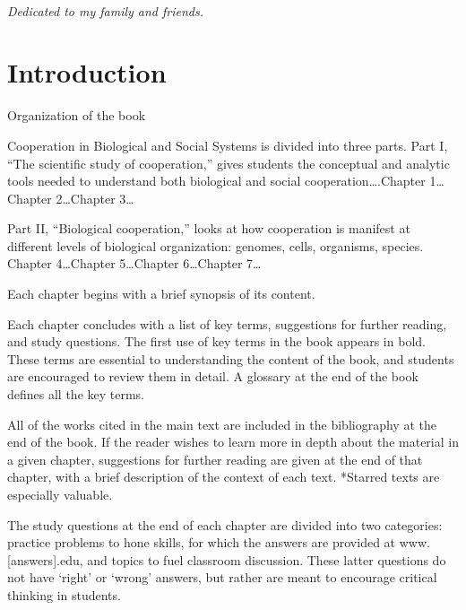 \documentclass{tufte-book} %
\begin{document}

\cleardoublepage
~\vfill
\begin{doublespace}
\noindent\fontsize{18}{22}\selectfont\itshape
\nohyphenation
Dedicated to my family and friends.
\end{doublespace}
\vfill
\vfill


\cleardoublepage
\chapter*{Introduction} %


Organization of the book

Cooperation in Biological and Social Systems is divided into three parts. Part I, “The scientific study of cooperation,” gives students the conceptual and analytic tools needed to understand both biological and social cooperation….Chapter 1…Chapter 2…Chapter 3…

Part II, “Biological cooperation,” looks at how cooperation is manifest at different levels of biological organization: genomes, cells, organisms, species. Chapter 4…Chapter 5…Chapter 6…Chapter 7…

Each chapter begins with a brief synopsis of its content. 


Each chapter concludes with a list of key terms, suggestions for further reading, and study questions. The first use of key terms in the book appears in bold. These terms are essential to understanding the content of the book, and students are encouraged to review them in detail. A glossary at the end of the book defines all the key terms. 

All of the works cited in the main text are included in the bibliography at the end of the book. If the reader wishes to learn more in depth about the material in a given chapter, suggestions for further reading are given at the end of that chapter, with a brief description of the context of each text. *Starred texts are especially valuable. 

The study questions at the end of each chapter are divided into two categories: practice problems to hone skills, for which the answers are provided at www.[answers].edu, and topics to fuel classroom discussion. These latter questions do not have ‘right’ or ‘wrong’ answers, but rather are meant to encourage critical thinking in students.
\end{document}
